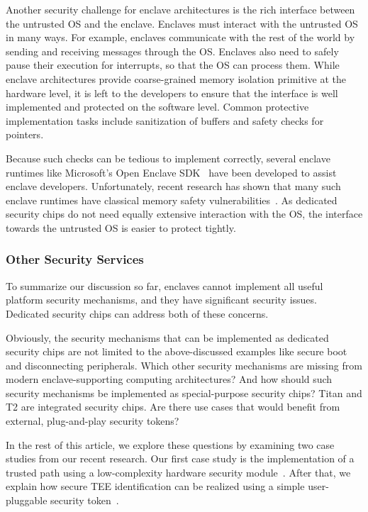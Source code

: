 Another security challenge for enclave architectures is the rich interface between the untrusted OS and the enclave. Enclaves must interact with the untrusted OS in many ways. For example, enclaves communicate with the rest of the world by sending and receiving messages through the OS. Enclaves also need to safely pause their execution for interrupts, so that the OS can process them. While enclave architectures provide coarse-grained memory isolation primitive at the hardware level, it is left to the developers to ensure that the interface is well implemented and protected on the software level. Common protective implementation tasks include sanitization of buffers and safety checks for pointers. 

Because such checks can be tedious to implement correctly, several enclave runtimes like Microsoft's Open Enclave SDK~\cite{open-enclave-sdk} have been developed to assist enclave developers. Unfortunately, recent research has shown that many such enclave runtimes have classical memory safety vulnerabilities~\cite{van2019tale}. As dedicated security chips do not need equally extensive interaction with the OS, the interface towards the untrusted OS is easier to protect tightly. 


\subsubsection*{Other Security Services}

To summarize our discussion so far, enclaves cannot implement all useful platform security mechanisms, and they have significant security issues. Dedicated security chips can address both of these concerns. 

Obviously, the security mechanisms that can be implemented as dedicated security chips are not limited to the above-discussed examples like secure boot and disconnecting peripherals. Which other security mechanisms are missing from modern enclave-supporting computing architectures? And how should such security mechanisms be implemented as special-purpose security chips? Titan and T2 are integrated security chips. Are there use cases that would benefit from external, plug-and-play security tokens?

In the rest of this article, we explore these questions by examining two case studies from our recent research. Our first case study is the implementation of a trusted path using a low-complexity hardware security module~\cite{protection}. After that, we explain how secure TEE identification can be realized using a simple user-pluggable security token~\cite{proximitee}.
